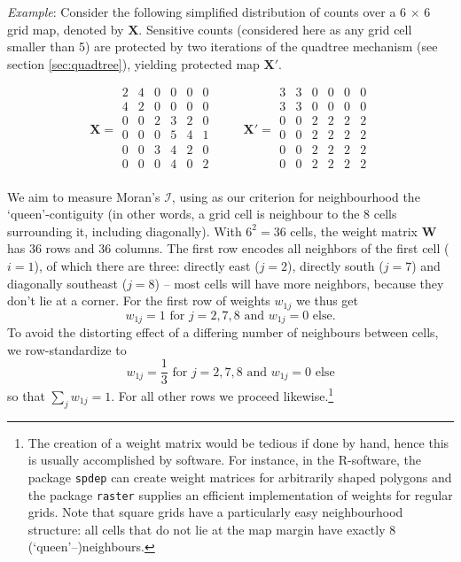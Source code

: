 \begin{tcolorbox}[breakable]
\emph{Example}:
Consider the following simplified distribution of counts over a 6 $\times$ 6 grid map, denoted by $\mathbf{X}$. Sensitive counts (considered here as any grid cell smaller than 5) are protected by two iterations of the quadtree mechanism (see section \ref{sec:quadtree}), yielding protected map $\mathbf{X}'$.

\[ 
\mathbf{X} = \begin{matrix} 
2 & 4 & 0 & 0 & 0 & 0\\
4 & 2 & 0 & 0 & 0 & 0\\
0 & 0 & 2 & 3 & 2 & 0\\
0 & 0 & 0 & 5 & 4 & 1\\
0 & 0 & 3 & 4 & 2 & 0\\
0 & 0 & 0 & 4 & 0 & 2\\
\end{matrix}
\hspace{1cm}
\mathbf{X}' = \begin{matrix} 
3 & 3 & 0 & 0 & 0 & 0\\
3 & 3 & 0 & 0 & 0 & 0\\
0 & 0 & 2 & 2 & 2 & 2\\
0 & 0 & 2 & 2 & 2 & 2\\
0 & 0 & 2 & 2 & 2 & 2\\
0 & 0 & 2 & 2 & 2 & 2\\
\end{matrix}
\]

We aim to measure Moran's $\mathcal{I}$, using as our criterion for neighbourhood the `queen'-contiguity (in other words, a grid cell is neighbour to the 8 cells surrounding it, including diagonally). With $6^2 = 36$ cells, the weight matrix $\mathbf{W}$ has 36 rows and 36 columns. The first row encodes all neighbors of the first cell ($i = 1$), of which there are three: directly east ($j = 2$), directly south ($j = 7$) and diagonally southeast ($j = 8$) -- most cells will have more neighbors, because they don't lie at a corner. For the first row of weights $w_{1j}$ we thus get
\[
w_{1j} = 1 \text{ for } j = 2,7,8 \text{ and } w_{1j} = 0 \text{ else}.
\]
To avoid the distorting effect of a differing number of neighbours between cells, we row-standardize to
\[
w_{1j} = \frac{1}{3} \text{ for } j = 2,7,8 \text{ and } w_{1j} = 0 \text{ else}
\]
so that $\sum_j w_{1j} = 1$. For all other rows we proceed likewise.\footnote{
    The creation of a weight matrix would be tedious if done by hand, hence this is usually accomplished by software. For instance, in the R-software, the package \texttt{spdep} can create weight matrices for arbitrarily shaped polygons and the package \texttt{raster} supplies an efficient implementation of weights for regular grids. Note that square grids have a particularly easy neighbourhood structure: all cells that do not lie at the map margin have exactly 8 (`queen'--)neighbours.}\\


\end{tcolorbox}
